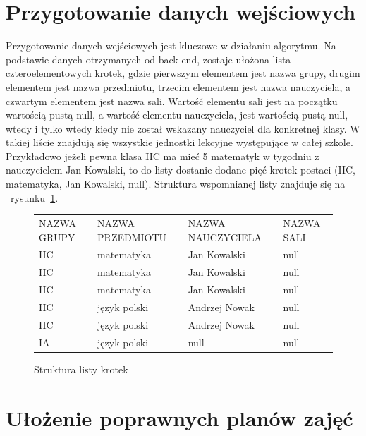 \section{Przygotowanie danych wejściowych}
    
    Przygotowanie danych wejściowych jest kluczowe w działaniu algorytmu. Na podstawie danych otrzymanych od back-end, zostaje ułożona lista czteroelementowych krotek, gdzie pierwszym elementem jest nazwa grupy, drugim elementem jest nazwa przedmiotu, trzecim elementem jest nazwa nauczyciela, a czwartym elementem jest nazwa sali. Wartość elementu sali jest na początku wartością pustą null, a wartość elementu nauczyciela, jest wartością pustą null, wtedy i tylko wtedy kiedy nie został wskazany nauczyciel dla konkretnej klasy. W takiej liście znajdują się wszystkie jednostki lekcyjne występujące w całej szkole. Przykładowo jeżeli pewna klasa IIC ma mieć 5 matematyk w tygodniu z nauczycielem Jan Kowalski, to do listy dostanie dodane pięć krotek postaci (IIC, matematyka, Jan Kowalski, null). Struktura wspomnianej listy znajduje się na ~rysunku~\ref{rys:krotki}.


\begin{figure}[]
\begin{tabular}{llll}
NAZWA GRUPY & NAZWA PRZEDMIOTU & NAZWA NAUCZYCIELA & NAZWA SALI \\
IIC         & matematyka       & Jan Kowalski      & null       \\
IIC         & matematyka       & Jan Kowalski      & null       \\
IIC         & matematyka       & Jan Kowalski      & null       \\
IIC         & język polski     & Andrzej Nowak     & null       \\
IIC         & język polski     & Andrzej Nowak     & null       \\
IA          & język polski     & null              & null      
\end{tabular}
\caption{Struktura listy krotek} \label{rys:krotki}
\end{figure}

\section{Ułożenie poprawnych planów zajęć}

